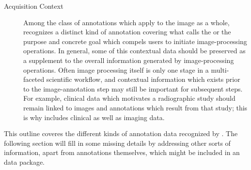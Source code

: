 {\begin{description}
\item[Acquisition Context]  Among the class of 
annotations which apply to the image as a whole, 
\AXFI{} recognizes a distinct kind of annotation 
covering what \AIM{} calls the  
or the purpose and concrete goal which compels 
users to initiate image-processing operations.  
In general, some of this contextual data 
should be preserved as a supplement to 
the overall information generated by image-processing 
operations.  Often image processing itself is only 
one stage in a multi-faceted scientific workflow, 
and contextual information which exists prior to 
the image-annotation step may still be important 
for subsequent steps.  For example, clinical data 
which motivates a radiographic study should remain 
linked to images and annotations which result from 
that study; this is why \DICOMSR{} includes 
clinical as well as imaging data.  
\end{description}

This outline coveres the different kinds 
of annotation data recognized by \AXFI{}.  
The following section will fill in some 
missing details by addressing other 
sorts of information, apart from annotations 
themselves, which might be included in an 
\AXFI{} data package.}

